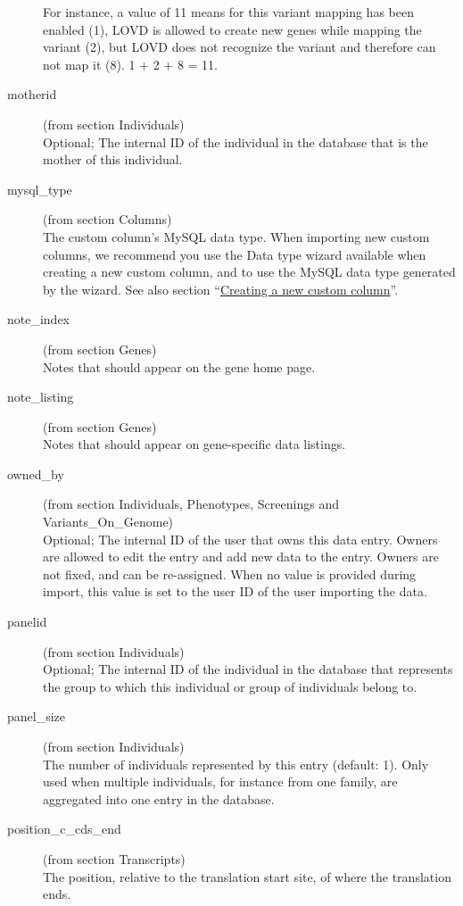 \documentclass[a4paper,oneside,openany,12pt]{memoir}
\begin{document}
\begin{description}
  For instance, a value of 11 means for this variant mapping has been enabled (1), LOVD is allowed to create new genes
    while mapping the variant (2), but LOVD does not recognize the variant and therefore can not map it (8). 1 + 2 + 8
    = 11.
  \item[motherid] (from section Individuals)\hfill \\
  Optional; The internal ID of the individual in the database that is the mother of this individual.
  \item[mysql\_type] (from section Columns)\hfill \\
  The custom column's MySQL data type.
  When importing new custom columns, we recommend you use the Data type wizard available when creating a new custom column, and to use the MySQL data type generated by the wizard.
  See also section ``\hyperlink{sec:custom_column_create}{Creating a new custom column}''.
  \item[note\_index] (from section Genes)\hfill \\
  Notes that should appear on the gene home page.
  \item[note\_listing] (from section Genes)\hfill \\
  Notes that should appear on gene-specific data listings.
  \item[owned\_by] (from section Individuals, Phenotypes, Screenings and Variants\_On\_Genome)\hfill \\
  Optional; The internal ID of the user that owns this data entry.
  Owners are allowed to edit the entry and add new data to the entry.
  Owners are not fixed, and can be re-assigned.
  When no value is provided during import, this value is set to the user ID of the user importing the data.
  \item[panelid] (from section Individuals)\hfill \\
  Optional; The internal ID of the individual in the database that represents the group to which this individual or group of individuals belong to.
  \item[panel\_size] (from section Individuals)\hfill \\
  The number of individuals represented by this entry (default: 1).
  Only used when multiple individuals, for instance from one family, are aggregated into one entry in the database.
  \item[position\_c\_cds\_end] (from section Transcripts)\hfill \\
  The position, relative to the translation start site, of where the translation ends.

\end{description}
\end{document}
